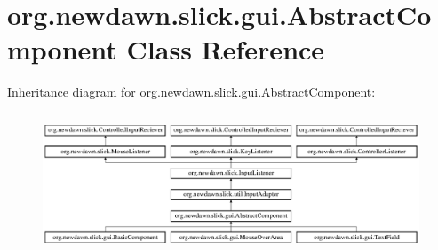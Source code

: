 \hypertarget{classorg_1_1newdawn_1_1slick_1_1gui_1_1_abstract_component}{}\section{org.\+newdawn.\+slick.\+gui.\+Abstract\+Component Class Reference}
\label{classorg_1_1newdawn_1_1slick_1_1gui_1_1_abstract_component}
Inheritance diagram for org.\+newdawn.\+slick.\+gui.\+Abstract\+Component\+:\begin{figure}[H]
\begin{center}
\leavevmode
\includegraphics[height=4.226415cm]{classorg_1_1newdawn_1_1slick_1_1gui_1_1_abstract_component}
\end{center}
\end{figure}
